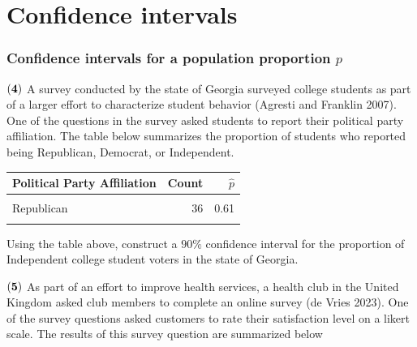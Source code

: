 \documentclass[
]{article}
\begin{document}
\section{Confidence intervals}\label{confidence-intervals}

\subsubsection{\texorpdfstring{Confidence intervals for a population
proportion
\(p\)}{Confidence intervals for a population proportion p}}\label{confidence-intervals-for-a-population-proportion-p}

\(\bf (4)\) A survey conducted by the state of Georgia surveyed college
students as part of a larger effort to characterize student behavior
(Agresti and Franklin 2007). One of the questions in the survey asked
students to report their political party affiliation. The table below
summarizes the proportion of students who reported being Republican,
Democrat, or Independent.

\begin{table}[H]
\centering\centering
\begin{tabular}{lrr}
\toprule
Political Party Affiliation & Count & $\hat{p}$\\
\midrule
\cellcolor{gray!10}{Democrat} & \cellcolor{gray!10}{8} & \cellcolor{gray!10}{0.14}\\
Republican & 36 & 0.61\\
\cellcolor{gray!10}{Independent} & \cellcolor{gray!10}{15} & \cellcolor{gray!10}{0.25}\\
\bottomrule
\end{tabular}
\end{table}

Using the table above, construct a \(90\%\) confidence interval for the
proportion of Independent college student voters in the state of
Georgia.

\(\bf (5)\) As part of an effort to improve health services, a health
club in the United Kingdom asked club members to complete an online
survey (de Vries 2023). One of the survey questions asked customers to
rate their satisfaction level on a likert scale. The results of this
survey question are summarized below
\end{document}
